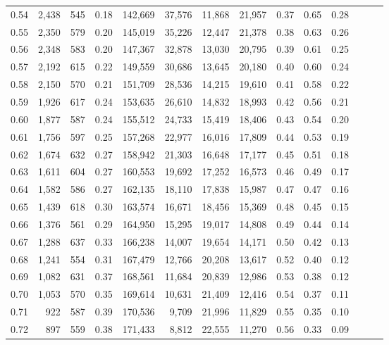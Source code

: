 \begin{tabular}{rrrrrrrrrrrrrr}
0.54 &  2,438 &  545 &  0.18 &  142,669 &   37,576 &  11,868 &  21,957 &  0.37 &  0.65 &      0.28 \\
0.55 &  2,350 &  579 &  0.20 &  145,019 &   35,226 &  12,447 &  21,378 &  0.38 &  0.63 &      0.26 \\
0.56 &  2,348 &  583 &  0.20 &  147,367 &   32,878 &  13,030 &  20,795 &  0.39 &  0.61 &      0.25 \\
0.57 &  2,192 &  615 &  0.22 &  149,559 &   30,686 &  13,645 &  20,180 &  0.40 &  0.60 &      0.24 \\
0.58 &  2,150 &  570 &  0.21 &  151,709 &   28,536 &  14,215 &  19,610 &  0.41 &  0.58 &      0.22 \\
0.59 &  1,926 &  617 &  0.24 &  153,635 &   26,610 &  14,832 &  18,993 &  0.42 &  0.56 &      0.21 \\
0.60 &  1,877 &  587 &  0.24 &  155,512 &   24,733 &  15,419 &  18,406 &  0.43 &  0.54 &      0.20 \\
0.61 &  1,756 &  597 &  0.25 &  157,268 &   22,977 &  16,016 &  17,809 &  0.44 &  0.53 &      0.19 \\
0.62 &  1,674 &  632 &  0.27 &  158,942 &   21,303 &  16,648 &  17,177 &  0.45 &  0.51 &      0.18 \\
0.63 &  1,611 &  604 &  0.27 &  160,553 &   19,692 &  17,252 &  16,573 &  0.46 &  0.49 &      0.17 \\
0.64 &  1,582 &  586 &  0.27 &  162,135 &   18,110 &  17,838 &  15,987 &  0.47 &  0.47 &      0.16 \\
0.65 &  1,439 &  618 &  0.30 &  163,574 &   16,671 &  18,456 &  15,369 &  0.48 &  0.45 &      0.15 \\
0.66 &  1,376 &  561 &  0.29 &  164,950 &   15,295 &  19,017 &  14,808 &  0.49 &  0.44 &      0.14 \\
0.67 &  1,288 &  637 &  0.33 &  166,238 &   14,007 &  19,654 &  14,171 &  0.50 &  0.42 &      0.13 \\
0.68 &  1,241 &  554 &  0.31 &  167,479 &   12,766 &  20,208 &  13,617 &  0.52 &  0.40 &      0.12 \\
0.69 &  1,082 &  631 &  0.37 &  168,561 &   11,684 &  20,839 &  12,986 &  0.53 &  0.38 &      0.12 \\
0.70 &  1,053 &  570 &  0.35 &  169,614 &   10,631 &  21,409 &  12,416 &  0.54 &  0.37 &      0.11 \\
0.71 &    922 &  587 &  0.39 &  170,536 &    9,709 &  21,996 &  11,829 &  0.55 &  0.35 &      0.10 \\
0.72 &    897 &  559 &  0.38 &  171,433 &    8,812 &  22,555 &  11,270 &  0.56 &  0.33 &      0.09 \\

\end{tabular}
